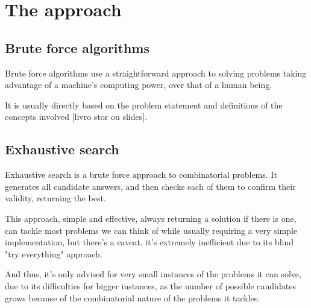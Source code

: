 \documentclass[...]{revdetua}
\begin{document}
\section{The approach}
\subsection{Brute force algorithms}
Brute force algorithms use a straightforward approach to solving problems taking advantage of a machine's computing power, over that of a human being.\par
It is usually directly based on the problem statement and definitions of the concepts involved [livro stor ou slides]. 
\subsection{Exhaustive search}
Exhaustive search is a brute force approach to combinatorial problems.
It generates all candidate answers, and then checks each of them to confirm their validity, returning the best.\par
This approach, simple and effective, always returning a solution if there is one, can tackle most problems we can think of while usually requiring a very simple implementation, but there's a caveat, it's extremely inefficient due to its blind "try everything" approach.\par And thus, it's only advised for very small instances of the problems it can solve, due to its difficulties for bigger instances, as the number of possible candidates grows because of the combinatorial nature of the problems it tackles.
\end{document}
